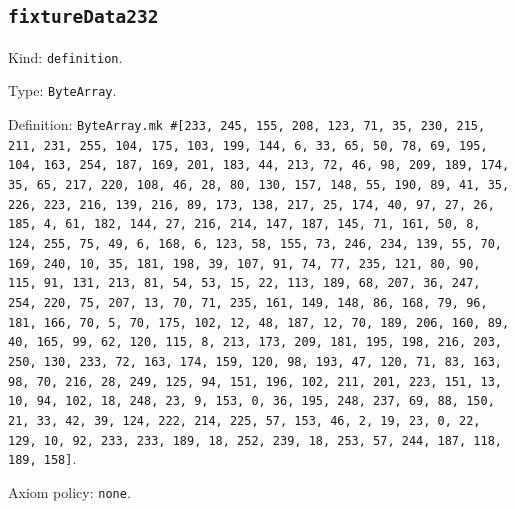 \documentclass[11pt]{article}
\begin{document}
\subsection*{\texttt{fixtureData232}}
\noindent Kind: \texttt{definition}.\par
\noindent Type: \texttt{ByteArray}.\par
\noindent Definition: \texttt{ByteArray.mk \#[233, 245, 155, 208, 123, 71, 35, 230, 215, 211, 231, 255, 104, 175, 103, 199, 144, 6, 33, 65, 50, 78, 69, 195, 104, 163, 254, 187, 169, 201, 183, 44, 213, 72, 46, 98, 209, 189, 174, 35, 65, 217, 220, 108, 46, 28, 80, 130, 157, 148, 55, 190, 89, 41, 35, 226, 223, 216, 139, 216, 89, 173, 138, 217, 25, 174, 40, 97, 27, 26, 185, 4, 61, 182, 144, 27, 216, 214, 147, 187, 145, 71, 161, 50, 8, 124, 255, 75, 49, 6, 168, 6, 123, 58, 155, 73, 246, 234, 139, 55, 70, 169, 240, 10, 35, 181, 198, 39, 107, 91, 74, 77, 235, 121, 80, 90, 115, 91, 131, 213, 81, 54, 53, 15, 22, 113, 189, 68, 207, 36, 247, 254, 220, 75, 207, 13, 70, 71, 235, 161, 149, 148, 86, 168, 79, 96, 181, 166, 70, 5, 70, 175, 102, 12, 48, 187, 12, 70, 189, 206, 160, 89, 40, 165, 99, 62, 120, 115, 8, 213, 173, 209, 181, 195, 198, 216, 203, 250, 130, 233, 72, 163, 174, 159, 120, 98, 193, 47, 120, 71, 83, 163, 98, 70, 216, 28, 249, 125, 94, 151, 196, 102, 211, 201, 223, 151, 13, 10, 94, 102, 18, 248, 23, 9, 153, 0, 36, 195, 248, 237, 69, 88, 150, 21, 33, 42, 39, 124, 222, 214, 225, 57, 153, 46, 2, 19, 23, 0, 22, 129, 10, 92, 233, 233, 189, 18, 252, 239, 18, 253, 57, 244, 187, 118, 189, 158]}.\par
\noindent Axiom policy: \texttt{none}.\par
\end{document}
